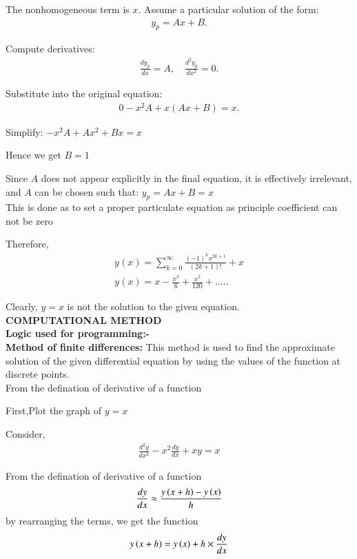 \documentclass[journal]{IEEEtran}
\begin{document}
The nonhomogeneous term is $x$. Assume a particular solution of the form:
\begin{align}
y_p = Ax + B.
\end{align}

Compute derivatives:
\begin{align}
\frac{dy_p}{dx} = A, \quad \frac{d^2y_p}{dx^2} = 0.
\end{align}

Substitute into the original equation:
\begin{align}
0 - x^2A + x(Ax + B) = x.
\end{align}

Simplify: $-x^2A + Ax^2 + Bx = x$

Hence we get $B=1$

Since $A$ does not appear explicitly in the final equation, it is effectively irrelevant, and $A$ can be chosen such that: $y_p = Ax + B = x$\\
This is done as to set a proper particulate equation as principle coefficient can not be zero


Therefore,
\begin{align}
y(x) = \sum_{k=0}^\infty \frac{(-1)^k x^{2k+1}}{(2k+1)!} + x\\
y(x) = x - \frac{x^3}{6} + \frac{x^5}{120} + .....
\end{align}

Clearly, $y=x$ is not the solution to the given equation.\\


\textbf{COMPUTATIONAL METHOD}\\

\textbf{Logic used for programming:-} \\

\textbf{Method of finite differences:} This method is used to find the approximate solution of the given differential equation by using the values of the function at discrete points.  \\
From the defination of derivative of a function 

First,Plot the graph of $y=x$

Consider,
\begin{align}
\frac{d^2y}{dx^2} - x^2\frac{dy}{dx} + xy = x
\end{align}

From the defination of derivative of a function 
\begin{align}
\frac{dy}{dx} \approx \frac{y\left(x+h\right)-y\left(x\right)}{h} \label{11}
\end{align}
by rearranging the terms, we get the function
\begin{align}
y\left(x+h\right)=y\left(x\right)+h \times \frac{dy}{dx} \\
\end{align}
\end{document}
